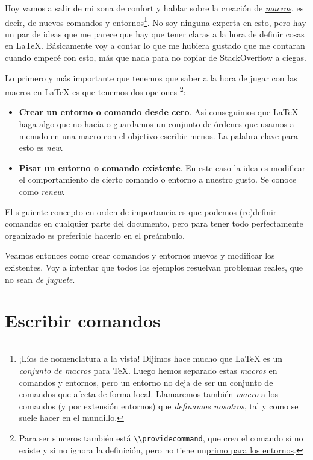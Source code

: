 Hoy vamos a salir de mi zona de confort y hablar sobre la creación de
\href{http://foldoc.org/macro}{\emph{macros}}, es decir, de nuevos
comandos y entornos\footnote{¡Líos de nomenclatura a la vista! Dijimos
  hace mucho que LaTeX es un \emph{conjunto de macros} para TeX. Luego
  hemos separado estas \emph{macros} en comandos y entornos, pero un
  entorno no deja de ser un conjunto de comandos que afecta de forma
  local. Llamaremos también \emph{macro} a los comandos (y por extensión
  entornos) que \emph{definamos nosotros}, tal y como se suele hacer en
  el mundillo.}. No soy ninguna experta en esto, pero hay un par de
ideas que me parece que hay que tener claras a la hora de definir cosas
en LaTeX. Básicamente voy a contar lo que me hubiera gustado que me
contaran cuando empecé con esto, más que nada para no copiar de
StackOverflow a ciegas.

Lo primero y más importante que tenemos que saber a la hora de jugar con
las macros en LaTeX es que tenemos dos opciones
\footnote{Para ser sinceros también está \lstinline!\\providecommand!, que crea el comando si no existe y si no ignora la definición, pero no tiene un\href{https://tex.stackexchange.com/questions/56667/why-is-there-no-provideenvironment}{primo para los entornos}.}:

\begin{itemize}
\item
  \textbf{Crear un entorno o comando desde cero}. Así conseguimos que
  LaTeX haga algo que no hacía o guardamos un conjunto de órdenes que
  usamos a menudo en una macro con el objetivo escribir menos. La
  palabra clave para esto es \emph{new}.
\item
  \textbf{Pisar un entorno o comando existente}. En este caso la idea es
  modificar el comportamiento de cierto comando o entorno a nuestro
  gusto. Se conoce como \emph{renew}.
\end{itemize}

El siguiente concepto en orden de importancia es que podemos (re)definir
comandos en cualquier parte del documento, pero para tener todo
perfectamente organizado es preferible hacerlo en el preámbulo.

Veamos entonces como crear comandos y entornos nuevos y modificar los
existentes. Voy a intentar que todos los ejemplos resuelvan problemas
reales, que no sean \emph{de juguete}.

\section{Escribir comandos}

